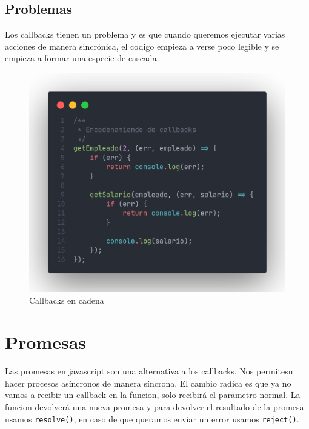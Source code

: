 \documentclass[12pt]{article}
\begin{document}
\subsection{Problemas}
Los callbacks tienen un problema y es que cuando queremos ejecutar varias acciones de manera sincrónica, el codigo empieza a verse poco legible y se empieza a formar una especie de cascada.

\begin{figure}[H]
	\centering
	\includegraphics[scale=0.25]{assets/images/callbacks-3.png}
	\caption{Callbacks en cadena}
\end{figure}

\section{Promesas}

Las promesas en javascript son una alternativa a los callbacks. Nos permitesn hacer procesos asíncronos de manera síncrona. El cambio radica es que ya no vamos a recibir un callback en la funcion, solo recibirá el parametro normal. La funcion devolverá una nueva promesa y para devolver el resultado de la promesa usamos \lstinline{resolve()}, en caso de que queramos enviar un error usamos \lstinline{reject()}.
\end{document}
